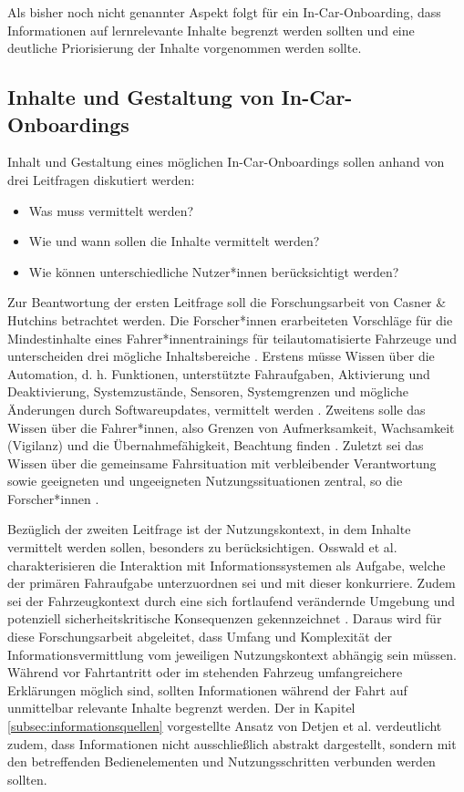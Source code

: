 Als bisher noch nicht genannter Aspekt folgt für ein In-Car-Onboarding, dass Informationen auf lernrelevante Inhalte begrenzt werden sollten und eine deutliche Priorisierung der Inhalte vorgenommen werden sollte.

\subsection{Inhalte und Gestaltung von In-Car-Onboardings}
\label{subsec:onboarding_gestaltung}

Inhalt und Gestaltung eines möglichen In-Car-Onboardings sollen anhand von drei Leitfragen diskutiert werden:
\begin{itemize}
  \item Was muss vermittelt werden?
  \item Wie und wann sollen die Inhalte vermittelt werden?
  \item Wie können unterschiedliche Nutzer*innen berücksichtigt werden?
\end{itemize} 

Zur Beantwortung der ersten Leitfrage soll die Forschungsarbeit von Casner \& Hutchins \cite{casner2019we} betrachtet werden. Die Forscher*innen erarbeiteten Vorschläge für die Mindestinhalte eines Fahrer*innentrainings für teilautomatisierte Fahrzeuge und unterscheiden drei mögliche Inhaltsbereiche \cite{casner2019we}. Erstens müsse Wissen über die Automation, d. h. Funktionen, unterstützte Fahraufgaben, Aktivierung und Deaktivierung, Systemzustände, Sensoren, Systemgrenzen und mögliche Änderungen durch Softwareupdates, vermittelt werden \cite{casner2019we}. Zweitens solle das Wissen über die Fahrer*innen, also Grenzen von Aufmerksamkeit, Wachsamkeit (Vigilanz) und die Übernahmefähigkeit, Beachtung finden \cite{casner2019we}. Zuletzt sei das Wissen über die gemeinsame Fahrsituation mit verbleibender Verantwortung sowie geeigneten und ungeeigneten Nutzungssituationen zentral, so die Forscher*innen \cite{casner2019we}.

Bezüglich der zweiten Leitfrage ist der Nutzungskontext, in dem Inhalte vermittelt werden sollen, besonders zu berücksichtigen. Osswald et al. \cite{osswald2012predicting} charakterisieren die Interaktion mit Informationssystemen als Aufgabe, welche der primären Fahraufgabe unterzuordnen sei und mit dieser konkurriere. Zudem sei der Fahrzeugkontext durch eine sich fortlaufend verändernde Umgebung und potenziell sicherheitskritische Konsequenzen gekennzeichnet \cite{osswald2012predicting}. Daraus wird für diese Forschungsarbeit abgeleitet, dass Umfang und Komplexität der Informationsvermittlung vom jeweiligen Nutzungskontext abhängig sein müssen. Während vor Fahrtantritt oder im stehenden Fahrzeug umfangreichere Erklärungen möglich sind, sollten Informationen während der Fahrt auf unmittelbar relevante Inhalte begrenzt werden. Der in Kapitel \ref{subsec:informationsquellen} vorgestellte Ansatz von Detjen et al. \cite{detjen2021supporting} verdeutlicht zudem, dass Informationen nicht ausschließlich abstrakt dargestellt, sondern mit den betreffenden Bedienelementen und Nutzungsschritten verbunden werden sollten.

